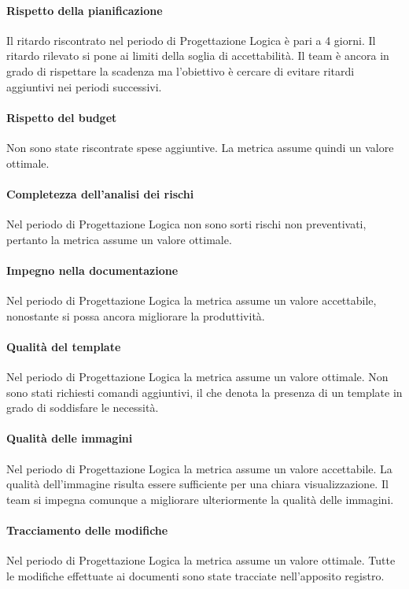 \paragraph{Rispetto della pianificazione}
\label{R2RDP}
Il ritardo riscontrato nel periodo di Progettazione Logica è pari a 4 giorni. Il ritardo rilevato si pone ai limiti della soglia di accettabilità. Il team è ancora in grado di rispettare la scadenza ma l'obiettivo è cercare di evitare ritardi aggiuntivi nei periodi successivi.

\paragraph{Rispetto del budget}
\label{R2RDB}
Non sono state riscontrate spese aggiuntive. La metrica assume quindi un valore ottimale.

\paragraph{Completezza dell'analisi dei rischi}
\label{R2CDADR}
Nel periodo di Progettazione Logica non sono sorti rischi non preventivati, pertanto la metrica assume un valore ottimale.

\paragraph{Impegno nella documentazione}
\label{R2IND}
Nel periodo di Progettazione Logica la metrica assume un valore accettabile, nonostante si possa ancora migliorare la produttività.

\paragraph{Qualità del template}
\label{R2QDT}
Nel periodo di Progettazione Logica la metrica assume un valore ottimale. Non sono stati richiesti comandi aggiuntivi, il che denota la presenza di un template in grado di soddisfare le necessità.

\paragraph{Qualità delle immagini}
\label{R2QDI}
Nel periodo di Progettazione Logica la metrica assume un valore accettabile. La qualità dell'immagine risulta essere sufficiente per una chiara visualizzazione. Il team si impegna comunque a migliorare ulteriormente la qualità delle immagini.

\paragraph{Tracciamento delle modifiche}
\label{R2TDM}
Nel periodo di Progettazione Logica la metrica assume un valore ottimale. Tutte le modifiche effettuate ai documenti sono state tracciate nell'apposito registro.

